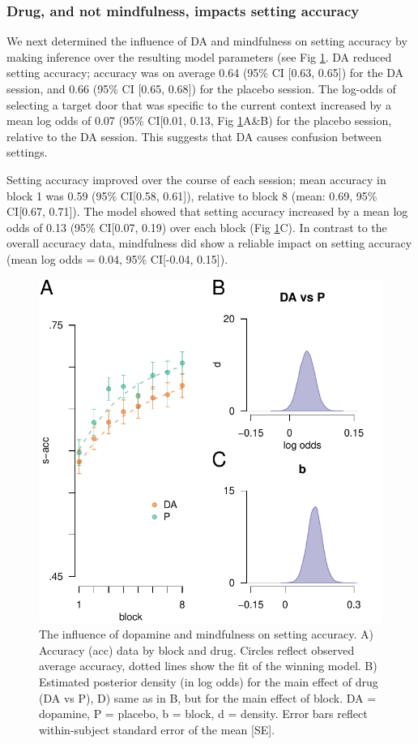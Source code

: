 \documentclass{article}
\begin{document}
\hypertarget{drug-and-not-mindfulness-impacts-setting-accuracy}{%
\subsubsection{Drug, and not mindfulness, impacts setting
accuracy}\label{drug-and-not-mindfulness-impacts-setting-accuracy}}

We next determined the influence of DA and mindfulness on setting
accuracy by making inference over the resulting model parameters (see
Fig \ref{fig:caccfig}. DA reduced setting accuracy; accuracy was on
average 0.64 (95\% CI {[}0.63, 0.65{]}) for the DA session, and 0.66
(95\% CI {[}0.65, 0.68{]}) for the placebo session. The log-odds of
selecting a target door that was specific to the current context
increased by a mean log odds of 0.07 (95\% CI{[}0.01, 0.13, Fig
\ref{fig:caccfig}A\&B) for the placebo session, relative to the DA
session. This suggests that DA causes confusion between settings.

Setting accuracy improved over the course of each session; mean accuracy
in block 1 was 0.59 (95\% CI{[}0.58, 0.61{]}), relative to block 8
(mean: 0.69, 95\% CI{[}0.67, 0.71{]}). The model showed that setting
accuracy increased by a mean log odds of 0.13 (95\% CI{[}0.07, 0.19)
over each block (Fig \ref{fig:caccfig}C). In contrast to the overall
accuracy data, mindfulness did show a reliable impact on setting
accuracy (mean log odds = 0.04, 95\% CI{[}-0.04, 0.15{]}).

\begin{figure}

{\centering \includegraphics[width=0.7\linewidth]{../../images/cacc_fig} 

}

\caption{The influence of dopamine and mindfulness on setting accuracy. A) Accuracy (acc) data by block and drug. Circles reflect observed average accuracy, dotted lines show the fit of the winning model. B) Estimated posterior density (in log odds) for the main effect of drug (DA vs P), D) same as in B, but for the main effect of block. DA = dopamine, P = placebo, b = block, d = density. Error bars reflect within-subject standard error of the mean [SE].}\label{fig:caccfig}
\end{figure}
\end{document}
